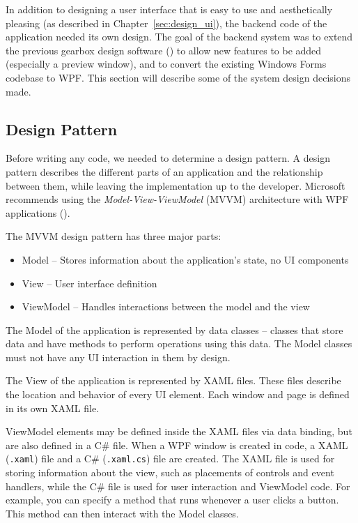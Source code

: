 \begin{doublespace}

In addition to designing a user interface that is easy to use and aesthetically pleasing (as described in Chapter~\ref{sec:design_ui}), the backend code of the application needed its own design. The goal of the backend system was to extend the previous gearbox design software (\cite{holman_automated_2018}) to allow new features to be added (especially a preview window), and to convert the existing Windows Forms codebase to WPF. This section will describe some of the system design decisions made.

\subsection{Design Pattern}

Before writing any code, we needed to determine a design pattern. A design pattern describes the different parts of an application and the relationship between them, while leaving the implementation up to the developer. Microsoft recommends using the \emph{Model-View-ViewModel} (MVVM) architecture with WPF applications (\cite{smith_patterns_2009}).

The MVVM design pattern has three major parts:
\begin{itemize}
    \item Model -- Stores information about the application's state, no UI components
    \item View -- User interface definition
    \item ViewModel -- Handles interactions between the model and the view
\end{itemize}

The Model of the application is represented by data classes --  classes that store data and have methods to perform operations using this data. The Model classes must not have any UI interaction in them by design.

The View of the application is represented by XAML files. These files describe the location and behavior of every UI element. Each window and page is defined in its own XAML file. 

ViewModel elements may be defined inside the XAML files via data binding, but are also defined in a C\# file. When a WPF window is created in code, a XAML (\texttt{.xaml}) file and a C\# (\texttt{.xaml.cs}) file are created. The XAML file is used for storing information about the view, such as placements of controls and event handlers, while the C\# file is used for user interaction and ViewModel code. For example, you can specify a method that runs whenever a user clicks a button. This method can then interact with the Model classes.


\end{doublespace}
